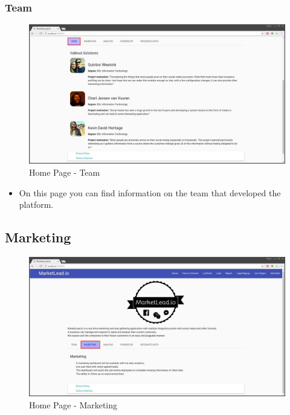 \documentclass{article}
\begin{document}
			\subsubsection{Team}
				\begin{figure}[H]
					\includegraphics[width=\textwidth]{images/home_team.jpg}
					\caption{Home Page - Team}
				\end{figure}

				\begin{itemize}
					\item On this page you can find information on the team that developed the platform.
				\end{itemize}

			\subsection{Marketing}
				\begin{figure}[H]
					\includegraphics[width=\textwidth]{images/home_marketing.jpg}
					\caption{Home Page - Marketing}
				\end{figure}
\end{document}
